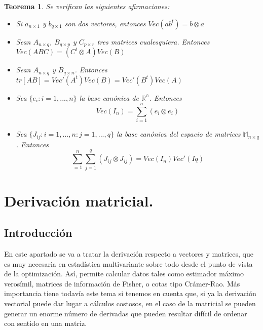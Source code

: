 \documentclass{article}
\theoremstyle{theorem-style}  %
\newtheorem{theorem}{Teorema}[section]  %
\theoremstyle{definition}
\theoremstyle{example-style}
\begin{document}
	\begin{theorem}
		\textit{Se verifican las siguientes afirmaciones:}
		
		\begin{itemize}
			\item \textit{Si $a_{n \times 1}$ y $b_{q \times 1}$ son dos vectores, entonces $Vec(a b^t )=b \otimes a$}
			
			\item \textit{Sean $A_{n \times q}$, $B_{q \times p}$ y $C_{p \times r }$ tres matrices cualesquiera. Entonces $Vec(ABC) = (C^t \otimes A)Vec(B)$}
			
			\item \textit{Sean $A_{n \times q}$ y $B_{q \times n}$. Entonces $tr[AB] = Vec'(A^t)Vec(B) = Vec'(B^t)Vec(A)$}
			
			\item \textit{Sea $\{e_i: i = 1, ..., n\}$ la base canónica de  $\mathbb{R^n}$. Entonces $$Vec(I_n) = \sum_{i=1}^{n}(e_i \otimes e_i)$$}
			
			\item \textit{Sea $\{J_{ij}: i = 1, ..., n: j = 1, ..., q\}$ la base canónica del espacio de matrices $\mathbb{M}_{n \times q}$. Entonces $$\sum_{=1}^{n}  \sum_{j=1}^{q} (J_{ij} \otimes J_{ij}) = Vec(I_n) Vec'(Iq)$$ }
			
		\end{itemize}
	\end{theorem}

\newpage
\section{Derivación matricial.}

\subsection{Introducción}

En este apartado se va a tratar la derivación respecto a vectores y matrices, que es muy necesaria en estadística multivariante sobre todo desde el punto de vista de la optimización. Así, permite calcular datos tales como estimador máximo verosímil, matrices de información de Fisher, o cotas tipo Crámer-Rao. Más importancia tiene todavía este tema si tenemos en cuenta que, si ya la derivación vectorial puede dar lugar a cálculos costosos, en el caso de la matricial se pueden generar un enorme número de derivadas que pueden resultar difícil de ordenar con sentido en una matriz. \\
\end{document}
